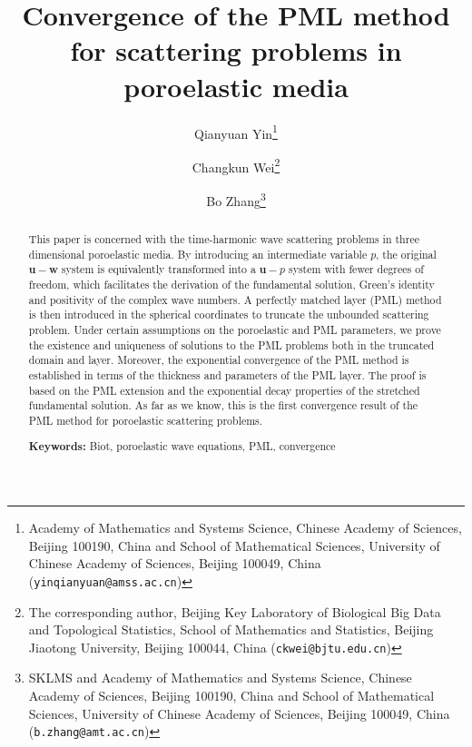 \documentclass[11pt]{article}
\begin{document}
\renewcommand{\theequation}{\arabic{section}.\arabic{equation}}

\title{\bf Convergence of the PML method for scattering problems in poroelastic media}
\author{Qianyuan Yin\thanks{Academy of Mathematics and Systems Science, Chinese Academy of Sciences,
Beijing 100190, China and School of Mathematical Sciences, University of Chinese Academy of Sciences,
Beijing 100049, China ({\tt yinqianyuan@amss.ac.cn})}
\and
Changkun Wei\thanks{The corresponding author, Beijing Key Laboratory of Biological Big Data and Topological Statistics, 
School of Mathematics and Statistics, Beijing Jiaotong University,
Beijing 100044, China ({\tt ckwei@bjtu.edu.cn})}
\and
Bo Zhang\thanks{SKLMS and Academy of Mathematics and Systems Science, Chinese Academy of Sciences,
Beijing 100190, China and School of Mathematical Sciences, University of Chinese Academy of Sciences,
Beijing 100049, China ({\tt b.zhang@amt.ac.cn})}
}
\date{}

\maketitle

\begin{abstract}
This paper is concerned with the time-harmonic wave scattering problems in three dimensional 
poroelastic media. By introducing an intermediate variable $p$, the original $\mathbf{u}-\mathbf{w}$ 
system is equivalently transformed into a $\mathbf{u}-p$ system with fewer degrees of freedom, which 
facilitates the derivation of the fundamental solution, Green's identity and positivity of the 
complex wave numbers. A perfectly matched layer (PML) method is then introduced in the spherical 
coordinates to truncate the unbounded scattering problem. Under certain assumptions on the poroelastic 
and PML parameters, we prove the existence and uniqueness of solutions to the PML problems both in the 
truncated domain and layer. Moreover, the exponential convergence of the PML method is established in 
terms of the thickness and parameters of the PML layer. The proof is based on the PML extension and 
the exponential decay properties of the stretched fundamental solution. As far as we know, this is the 
first convergence result of the PML method for poroelastic scattering problems.

\vspace{.2in}
{\bf Keywords:} Biot, poroelastic wave equations, PML, convergence
\end{abstract}
\end{document}
